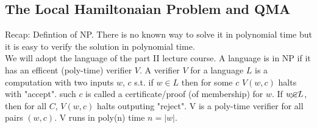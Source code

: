 \documentclass{article}
\begin{document}
\subsection{The Local Hamiltonaian Problem and QMA}
Recap: Defintion of NP. There is no known way to solve it in polynomial time but it is easy to verify the solution in polynomial time.\\
We will adopt the language of the part II lecture course. A language is in NP if it has an efficent (poly-time) verifier $V$. A verifier $V$ for a language $L$ is a computation with two inputs $w$, $c$ s.t. if $w \in L$ then for some $c$ $V(w,c)$ halts with "accept". such $c$ is called a certificate/proof (of membership) for $w$. If $w \cancel{\in} L$, then for all $C$, $V(w,c)$ halts outputing "reject". V is a poly-time verifier for all pairs $(w,c)$. V runs in poly(n) time $n = |w|$.
\end{document}
